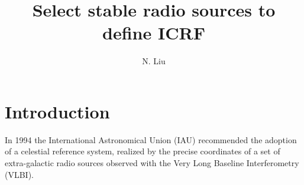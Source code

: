 \documentclass{aa}
\begin{document}
 


   \title{Select stable radio sources to define ICRF}

   \author{N. Liu}


 
  \abstract
   {}
   {}
   {}
   {}
   {}


   \maketitle
   
%
\section{Introduction}

In 1994 the International Astronomical Union (IAU) recommended the adoption of a celestial reference system, realized by the precise coordinates of a set of extra-galactic radio sources observed with the Very Long Baseline Interferometry (VLBI).


\end{document}
